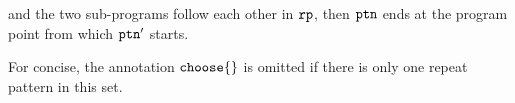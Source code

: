 \begin{lem}
\begin{itemize}
  and the two sub-programs follow each other in $\mathtt{rp}$, 
  then $\mathtt{ptn}$ ends at the program point from which $\mathtt{ptn}'$ starts.
  \end{itemize}
\end{lem}
%
For concise, the annotation $\rpchoose{}$ is omitted if there is only one repeat pattern in this set.
